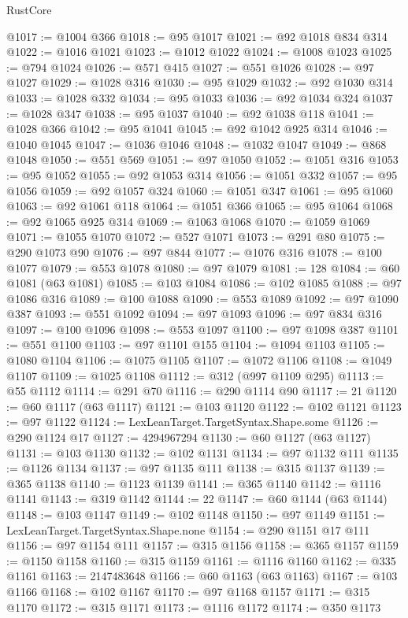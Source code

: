 \begin{lexlean}{RustCore}
\begin{coremodule}
@1017 := @1004 @366
@1018 := @95 @1017
@1021 := @92 @1018 @834 @314
@1022 := @1016 @1021
@1023 := @1012 @1022
@1024 := @1008 @1023
@1025 := @794 @1024
@1026 := @571 @415
@1027 := @551 @1026
@1028 := @97 @1027
@1029 := @1028 @316
@1030 := @95 @1029
@1032 := @92 @1030 @314
@1033 := @1028 @332
@1034 := @95 @1033
@1036 := @92 @1034 @324
@1037 := @1028 @347
@1038 := @95 @1037
@1040 := @92 @1038 @118
@1041 := @1028 @366
@1042 := @95 @1041
@1045 := @92 @1042 @925 @314
@1046 := @1040 @1045
@1047 := @1036 @1046
@1048 := @1032 @1047
@1049 := @868 @1048
@1050 := @551 @569
@1051 := @97 @1050
@1052 := @1051 @316
@1053 := @95 @1052
@1055 := @92 @1053 @314
@1056 := @1051 @332
@1057 := @95 @1056
@1059 := @92 @1057 @324
@1060 := @1051 @347
@1061 := @95 @1060
@1063 := @92 @1061 @118
@1064 := @1051 @366
@1065 := @95 @1064
@1068 := @92 @1065 @925 @314
@1069 := @1063 @1068
@1070 := @1059 @1069
@1071 := @1055 @1070
@1072 := @527 @1071
@1073 := @291 @80
@1075 := @290 @1073 @90
@1076 := @97 @844
@1077 := @1076 @316
@1078 := @100 @1077
@1079 := @553 @1078
@1080 := @97 @1079
@1081 := 128
@1084 := @60 @1081 (@63 @1081)
@1085 := @103 @1084
@1086 := @102 @1085
@1088 := @97 @1086 @316
@1089 := @100 @1088
@1090 := @553 @1089
@1092 := @97 @1090 @387
@1093 := @551 @1092
@1094 := @97 @1093
@1096 := @97 @834 @316
@1097 := @100 @1096
@1098 := @553 @1097
@1100 := @97 @1098 @387
@1101 := @551 @1100
@1103 := @97 @1101 @155
@1104 := @1094 @1103
@1105 := @1080 @1104
@1106 := @1075 @1105
@1107 := @1072 @1106
@1108 := @1049 @1107
@1109 := @1025 @1108
@1112 := @312 (@997 @1109 @295)
@1113 := @55 @1112
@1114 := @291 @70
@1116 := @290 @1114 @90
@1117 := 21
@1120 := @60 @1117 (@63 @1117)
@1121 := @103 @1120
@1122 := @102 @1121
@1123 := @97 @1122
@1124 := LexLeanTarget.TargetSyntax.Shape.some
@1126 := @290 @1124 @17
@1127 := 4294967294
@1130 := @60 @1127 (@63 @1127)
@1131 := @103 @1130
@1132 := @102 @1131
@1134 := @97 @1132 @111
@1135 := @1126 @1134
@1137 := @97 @1135 @111
@1138 := @315 @1137
@1139 := @365 @1138
@1140 := @1123 @1139
@1141 := @365 @1140
@1142 := @1116 @1141
@1143 := @319 @1142
@1144 := 22
@1147 := @60 @1144 (@63 @1144)
@1148 := @103 @1147
@1149 := @102 @1148
@1150 := @97 @1149
@1151 := LexLeanTarget.TargetSyntax.Shape.none
@1154 := @290 @1151 @17 @111
@1156 := @97 @1154 @111
@1157 := @315 @1156
@1158 := @365 @1157
@1159 := @1150 @1158
@1160 := @315 @1159
@1161 := @1116 @1160
@1162 := @335 @1161
@1163 := 2147483648
@1166 := @60 @1163 (@63 @1163)
@1167 := @103 @1166
@1168 := @102 @1167
@1170 := @97 @1168 @1157
@1171 := @315 @1170
@1172 := @315 @1171
@1173 := @1116 @1172
@1174 := @350 @1173

\end{coremodule}
\end{lexlean}
